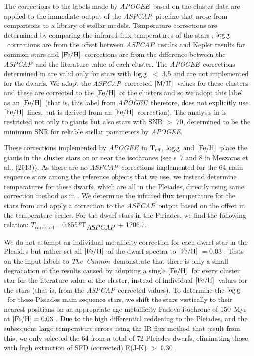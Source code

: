 \documentclass[12pt, preprint]{aastex}
\newcommand{\figurenames}{\figurename s}
\newcommand{\tc}{\textsl{The~Cannon}}
\newcommand{\apogee}{\textsl{APOGEE}}
\newcommand{\aspcap}{\textsl{ASPCAP}}
\newcommand{\teff}{\mbox{$\rm T_{eff}$}}
\newcommand{\feh}{\mbox{$\rm [Fe/H]$}}
\newcommand{\mh}{\mbox{$\rm [M/H]$}}
\newcommand{\logg}{\mbox{$\rm \log g$}}
\begin{document}
The corrections to the labels made by \apogee\ based on the cluster data are applied to the immediate output of the \aspcap\ pipeline that arose from comparisons to a library of stellar models.
Temperature corrections are determined by comparing the infrared flux temperatures of the stars \citep{gonzalez2009}, \logg\ corrections are from the offset between \aspcap\ results and Kepler results for common stars and \feh\ corrections are from the difference between the \aspcap\ and  the literature value of each cluster.  
The \apogee\ corrections determined in \citet{Meszaros2013} are valid only for stars with \logg\ $<$ 3.5 and are not implemented for the dwarfs.  We adopt the \aspcap\ corrected \mh\ values for these clusters and these are corrected to the \feh\ of the clusters and so we adopt this label as an \feh\ (that is, this label from \apogee\ therefore, does not explicitly use \feh\ lines, but is derived from an \feh\ correction). 
The analysis in \citet{Meszaros2013} is restricted not only to giants but also stars with SNR $>$ 70, determined to be the minimum SNR for reliable stellar parameters by \apogee.

These corrections implemented by \apogee\ in \teff, \logg\ and  \feh\ place the giants in the cluster stars on or near the iscohrones (see \figurenames~7 and 8 in Meszaros et al., (2013)).  
As there are no \aspcap\ corrections implemented for the 64 main sequence stars among the reference objects that we use, 
we instead determine temperatures for these dwarfs, which are all in the Pleiades, directly using same correction method 
as in \citet{Meszaros2013}. 
We determine the infrared flux temperature for the stars from \citet{gonzalez2009} and apply a correction to 
the \aspcap\ output based on the offset in the temperature scales. For the dwarf stars in the Pleiades, we find the following relation:
 $T_{\mbox{corrected}}$= 0.855*T$_{\mbox{\textit{\aspcap}}}$ + 1206.7.

We do not attempt an individual metallicity correction for each dwarf star in the Pleaides but rather set all \feh\ of the dwarf spectra to \feh\ = 0.03 \citep{barrado2001}.
Tests on the input labels to \tc\ demonstrate that there is only a small degradation of the results caused by adopting a single \feh\ for every cluster star for the literature value of the cluster, instead of individual \feh\ values for the stars (that is, from the \aspcap\ corrected values). 
To determine the \logg\ for these Pleiades main sequence stars, we shift the stars vertically to their nearest positions on an appropriate age-metallicity Padova isochrone of 150~Myr at $\feh = 0.03$ \citep{girardi2000}. 
Due to the high differential reddening to the Pleiades, and the subsequent large temperature errors using the IR flux method that result from this, we only selected the 64 from a total of 72 Pleiades dwarfs, eliminating those with high extinction of SFD (corrected) E(J-K) $>$ 0.30 \citep{Schlafly2011}.
\end{document}
